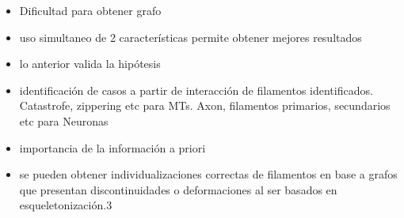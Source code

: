 \begin{conclusion}
\label{chap:conclu}
\begin{itemize}
    \item Dificultad para obtener grafo
    \item uso simultaneo de 2 caracter\'isticas permite obtener mejores resultados
    \item lo anterior valida la hip\'otesis
    \item identificaci\'on de casos a partir de interacci\'on de filamentos identificados. Catastrofe, zippering etc para MTs. Axon, filamentos primarios, secundarios etc para Neuronas 
    \item importancia de la informaci\'on a priori
    \item se pueden obtener individualizaciones correctas de filamentos en base a grafos que presentan discontinuidades o deformaciones al ser basados en esqueletonizaci\'on.3
\end{itemize}
\end{conclusion}
